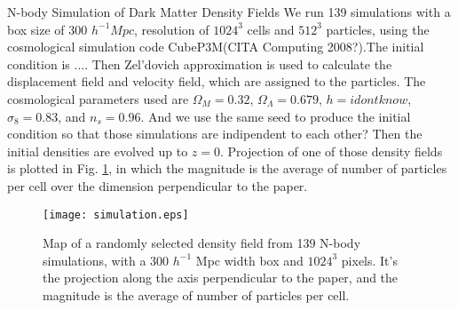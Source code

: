 \begin{section}{N-body Simulation of Dark Matter Density Fields}
  \label{sec:theory}
    We run 139 simulations with a box size of 300 $h^{-1}Mpc$, resolution of $1024^3$ cells and $512^3$ particles, using the cosmological simulation code CubeP3M(CITA Computing 2008?).The initial condition is .... Then Zel'dovich approximation is used to calculate the displacement field and velocity field, which are assigned to the particles. The cosmological parameters used are $\Omega_M=0.32$, $\Omega_{\Lambda}=0.679$, $h=i dont know$, $\sigma_8=0.83$, and $n_s=0.96$. And we use the same seed to produce the initial condition so that those simulations are indipendent to each other? Then the initial densities are evolved up to $z=0$. Projection of one of those density fields is plotted in Fig. \ref{fig:simulation}, in which the magnitude is the average of number of particles per cell over the dimension perpendicular to the paper.
\begin{figure}[tbp]
 \begin{center}
  \texttt{[image: simulation.eps]}
   \caption{Map of a randomly selected density field from 139 N-body simulations, with a 300 $h^{-1}$ Mpc width box and $1024^3$ pixels. It's the projection along the axis perpendicular to the paper, and the magnitude is the average of number of particles per cell.}
  \label{fig:simulation}
 \end{center}
\vspace{-0.7cm}
\end{figure}


\end{section}




















